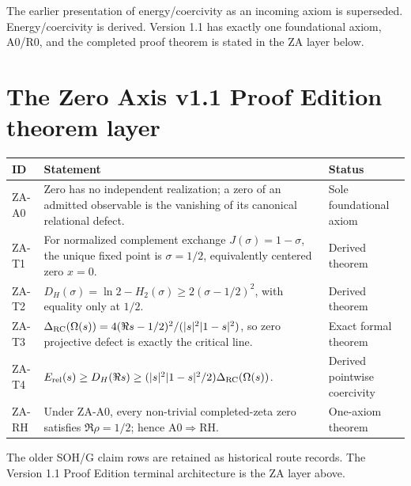 The earlier presentation of energy/coercivity as an incoming axiom is superseded. Energy/coercivity is derived. Version 1.1 has exactly one foundational axiom, A0/R0, and the completed proof theorem is stated in the ZA layer below.


\section{The Zero Axis v1.1 Proof Edition theorem layer}

\begin{longtable}{@{}p{}p{}p{}@{}}
\toprule ID & Statement & Status\\
\midrule
ZA-A0 & Zero has no independent realization; a zero of an admitted observable is the vanishing of its canonical relational defect. & Sole foundational axiom\\
ZA-T1 & For normalized complement exchange \(J(\sigma)=1-\sigma\), the unique fixed point is \(\sigma=1/2\), equivalently centered zero \(x=0\). & Derived theorem\\
ZA-T2 & \(D_H(\sigma)=\ln2-H_2(\sigma)\ge2(\sigma-1/2)^2\), with equality only at \(1/2\). & Derived theorem\\
ZA-T3 & \(\Delta_{\rm RC}(\Omega(s))=4(\Re s-1/2)^2/(|s|^2|1-s|^2)\), so zero projective defect is exactly the critical line. & Exact formal theorem\\
ZA-T4 & \(E_{\rm rel}(s)\ge D_H(\Re s)\ge(|s|^2|1-s|^2/2)\Delta_{\rm RC}(\Omega(s))\). & Derived pointwise coercivity\\
ZA-RH & Under ZA-A0, every non-trivial completed-zeta zero satisfies \(\Re\rho=1/2\); hence \(\mathrm{A0}\Rightarrow\mathrm{RH}\). & One-axiom theorem\\
\bottomrule
\end{longtable}

The older SOH/G claim rows are retained as historical route records. The
Version 1.1 Proof Edition terminal architecture is the ZA layer above.
